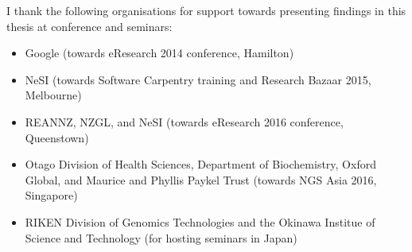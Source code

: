 I thank the following organisations for support towards presenting findings in this thesis at conference and seminars:

\begin{itemize}

\item
Google (towards eResearch 2014 conference, Hamilton)

\item
NeSI (towards Software Carpentry training and Research Bazaar 2015, Melbourne)

\item
REANNZ, NZGL, and NeSI (towards eResearch 2016 conference, Queenstown)

\item
Otago Division of Health Sciences, Department of Biochemistry, Oxford Global, and Maurice and Phyllis Paykel Trust (towards NGS Asia 2016, Singapore)

\item
RIKEN Division of Genomics Technologies and the Okinawa Institue of Science and Technology (for hosting seminars in Japan)

\end{itemize}


